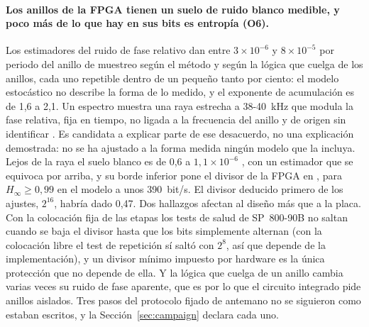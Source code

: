 \paragraph{Los anillos de la FPGA tienen un suelo de ruido blanco
medible, y poco más de lo que hay en sus bits es entropía (O6).} Los
estimadores del ruido de fase relativo dan entre $3\times10^{-6}$ y
$8\times10^{-5}$ por periodo del anillo de muestreo \meas{} según el
método y según la lógica que cuelga de los anillos, cada uno repetible
dentro de un pequeño tanto por ciento: el modelo estocástico no describe
la forma de lo medido, y el exponente de acumulación es de 1,6 a 2,1. Un
espectro muestra una raya estrecha a 38-40~kHz que modula la fase
relativa, fija en tiempo, no ligada a la frecuencia del anillo y de
origen sin identificar \meas{}. Es candidata a explicar parte de ese
desacuerdo, no una explicación demostrada: no se ha ajustado a la forma
medida ningún modelo que la incluya. Lejos de la
raya el suelo blanco es de 0,6 a $1{,}1\times10^{-6}$ \meas{}, con un
estimador que se equivoca por arriba, y su borde inferior pone el divisor
de la \ac{FPGA} en , para $H_\infty \ge 0{,}99$ en el modelo a
unos 390~bit/s. El divisor deducido primero de los ajustes, $2^{16}$,
habría dado 0,47. Dos hallazgos afectan al diseño más que a la placa. Con
la colocación fija de las etapas los tests de salud de SP~800-90B no
saltan cuando se baja el divisor hasta que los bits simplemente alternan
(con la colocación libre el test de repetición sí saltó con $2^{8}$, así
que depende de la implementación), y un divisor mínimo impuesto por
hardware es la única protección que no depende de ella. Y la lógica que cuelga de
un anillo cambia varias veces su ruido de fase aparente, que es por lo
que el circuito integrado pide anillos aislados. Tres pasos del protocolo
fijado de antemano no se siguieron como estaban escritos, y la
Sección~\ref{sec:campaign} declara cada uno.

